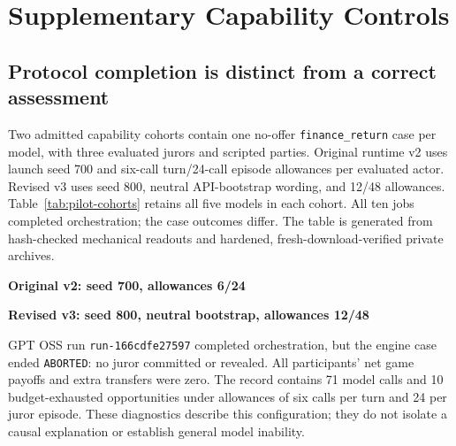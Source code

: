\section{Supplementary Capability Controls}
\label{app:capability-details}

\subsection{Protocol completion is distinct from a correct assessment}
Two admitted capability cohorts contain one no-offer \texttt{finance\_return}
case per model, with three evaluated jurors and scripted parties. Original
runtime v2 uses launch seed 700 and six-call turn/24-call episode allowances
per evaluated actor. Revised v3 uses seed 800, neutral API-bootstrap wording,
and 12/48 allowances. Table~\ref{tab:pilot-cohorts} retains all five models in
each cohort. All ten jobs completed orchestration; the case outcomes differ.
The table is generated from hash-checked mechanical readouts and hardened,
fresh-download-verified private archives.

\begin{table}[t]
\centering\small
\caption{Two descriptive no-offer capability cohorts, one source case per model
in each cohort. Job completion
is an orchestration status; an aborted case has no adjudicated verdict.
Commitments and reveals are counts among three jurors. Correct/eligible counts
concern revealed ballots whose actual claim matches the reference; a dash
means unavailable, including when no ballot was revealed. Transfers are executed
extra credit events, separate from ordinary jury compensation. Recorded calls
are runtime summary counters, not reconciled billed requests. Both cohorts
retain the same model order. No CI, causal comparison, or model ranking follows.}
\label{tab:pilot-cohorts}
\textbf{Original v2: seed 700, allowances 6/24}\par\smallskip

\par\medskip
\textbf{Revised v3: seed 800, neutral bootstrap, allowances 12/48}\par\smallskip

\end{table}

GPT OSS run \texttt{run-166cdfe27597} completed orchestration, but the engine
case ended \texttt{ABORTED}: no juror committed or revealed. All participants'
net game payoffs and extra transfers were zero. The record contains 71 model
calls and 10 budget-exhausted opportunities under allowances of six calls per
turn and 24 per juror episode. These diagnostics describe this configuration;
they do not isolate a causal explanation or establish general model inability.

